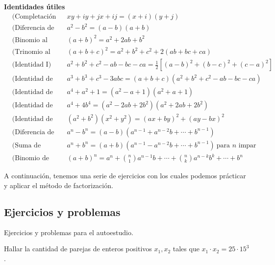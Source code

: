 \textbf{Identidades útiles}
\begin{align*}
    &\text{(Completación de rectángulo)} && xy + iy + jx + ij = (x + i)(y + j)\\[2mm]
    &\text{(Diferencia de cuadrados)} && a^2 - b^2 = (a - b)(a + b)\\[2mm]
    &\text{(Binomio al cuadrado)} && (a + b)^2 = a^2 + 2ab + b^2\\[2mm]
    &\text{(Trinomio al cuadrado)} && (a + b + c)^2 = a^2 + b^2 + c^2 + 2(ab + bc + ca)\\[1.5mm]
    &\text{(Identidad I)} && a^2 + b^2 + c^2 - ab - bc - ca = \frac{1}{2}\left[ (a - b)^2 + (b - c)^2 + (c - a)^2 \right]\\[1.5mm]
    &\text{(Identidad de Gauss)} && a^3 + b^3 + c^3 - 3abc = (a + b + c)(a^2 + b^2 + c^2 - ab - bc - ca)\\[2mm]
    &\text{(Identidad de Argand)} && a^4 + a^2 + 1 = (a^2 - a + 1)(a^2 + a + 1)\\[2mm]
    &\text{(Identidad de Sophie Germain)} && a^4 + 4 b^4 = (a^2 - 2ab + 2b^2)\left(a^2 + 2ab + 2b^2\right)\\[2mm]
    &\text{(Identidad de Brahmagupta)} && (a^2 + b^2) (x^2 + y^2) = (ax + by)^2 + (ay - bx)^2\\[2mm]
    &\text{(Diferencia de potencias)} && a^n - b^n = (a - b)(a^{n - 1} + a^{n - 2}b + \cdots + b^{n - 1})\\[2mm]
    &\text{(Suma de potencias)} && a^n + b^n = (a + b)(a^{n - 1} - a^{n - 2}b + \cdots + b^{n - 1}) \ \text{para $n$ impar}\\[1.5mm]
    &\text{(Binomio de Newton)} && (a + b)^n = a^n + \binom{n}{1} a^{n - 1}b + \cdots + \binom{n}{k} a^{n -k}b^k + \cdots + b^n
\end{align*}

A continuación, tenemos una serie de ejercicios con los cuales podemos prácticar y aplicar el método de factorización.


\subsection{Ejercicios y problemas}

Ejercicios y problemas para el autoestudio.

\begin{exercise}
    Hallar la cantidad de parejas de enteros positivos $x_1, x_2$ tales que $x_1 \cdot x_2 = 25 \cdot 15^3$.
\end{exercise}

